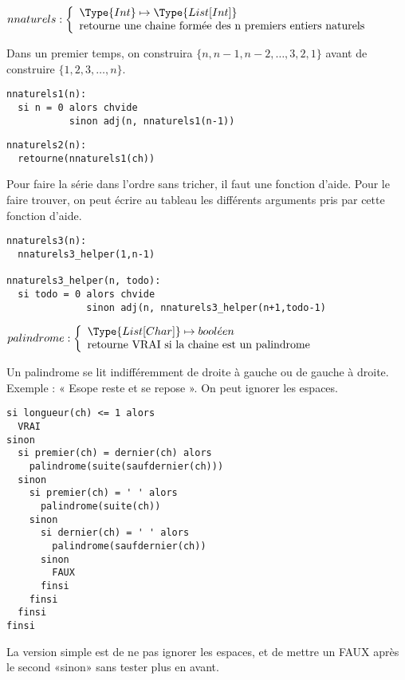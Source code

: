 \documentclass[10pt]{article}\usepackage[correction,nu]{esial}
\begin{document}
\begin{Question}
  $nnaturels: \left\{
    \begin{array}{l}
      \Type{Int}\mapsto \Type{List[Int]}\\
      \text{retourne une chaine formée des n premiers entiers naturels}
    \end{array}\right.$  
  
  Dans un premier temps, on construira $\{n, n-1, n-2, \ldots, 3, 2, 1\}$ avant
  de construire $\{1, 2, 3, \ldots, n\}$.
\end{Question}
\begin{Reponse}
  \begin{Verbatim}[label=Version simple qui donne la liste à l'envers]
nnaturels1(n):
  si n = 0 alors chvide
           sinon adj(n, nnaturels1(n-1))
  \end{Verbatim}

  \begin{Verbatim}[label=Version trichée qui donne la chaine à l'endroit:]
nnaturels2(n):
  retourne(nnaturels1(ch))
  \end{Verbatim}
  
  Pour faire la série dans l'ordre sans tricher, il faut une fonction
  d'aide. Pour le faire trouver, on peut écrire au tableau les différents
  arguments pris par cette fonction d'aide.
  \begin{Verbatim}[label=Version avec helper:]
nnaturels3(n):
  nnaturels3_helper(1,n-1)    

nnaturels3_helper(n, todo):
  si todo = 0 alors chvide
              sinon adj(n, nnaturels3_helper(n+1,todo-1)
  \end{Verbatim}
\end{Reponse}


\begin{Question}
  $palindrome: \left\{
    \begin{array}{l}
      \Type{List[Char]}\mapsto bool\acute{e}en\\
      \text{retourne VRAI si la chaine est un palindrome}
    \end{array}\right.$  

  Un palindrome se lit indifféremment de droite à gauche ou de gauche à droite.
  Exemple : « Esope reste et se repose ». On peut ignorer les espaces.
\end{Question}
\begin{Reponse}
  \begin{Verbatim}[label=palindrome(ch)]
si longueur(ch) <= 1 alors 
  VRAI
sinon
  si premier(ch) = dernier(ch) alors
    palindrome(suite(saufdernier(ch)))
  sinon 
    si premier(ch) = ' ' alors
      palindrome(suite(ch))
    sinon 
      si dernier(ch) = ' ' alors
        palindrome(saufdernier(ch))
      sinon
        FAUX
      finsi
    finsi    
  finsi
finsi    
  \end{Verbatim}
  La version simple est de ne pas ignorer les espaces, et de
  mettre un FAUX après le second «sinon» sans tester plus en avant.
\end{Reponse}
\end{document}

